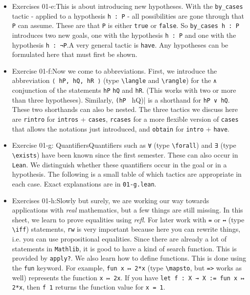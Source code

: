 \documentclass{memoir}
\begin{document}
\begin{itemize}
\begin{itemize}
\end{itemize}
\item Exercises 01-e:This is about introducing new hypotheses. With the \Verb|by_cases| tactic - applied to a hypothesis \Verb|h : P| - all possibilities are gone through that \Verb|P| can assume. These are that \Verb|P| is either \Verb|true| or \Verb|false|. So \Verb|by_cases h : P| introduces two new goals, one with the hypothesis \Verb|h : P| and one with the hypothesis \Verb|h : ¬P|.A very general tactic is \Verb|have|. Any hypotheses can be formulated here that must first be shown.\item Exercise 01-f:Now we come to abbreviations. First, we introduce the abbreviation \Verb|⟨ hP, hQ, hR ⟩| (type \Verb|\langle| and \Verb|\rangle|) for the \Verb|∧| conjunction of the statements \Verb|hP| \Verb|hQ| and \Verb|hR|. (This works with two or more than three hypotheses). Similarly, \Verb|(hP | hQ)| is a shorthand for \Verb|hP ∨ hQ|. These two shorthands can also be nested. The three tactics we discuss here are \Verb|rintro| for \Verb|intros| + \Verb|cases|, \Verb|rcases| for a more flexible version of \Verb|cases| that allows the notations just introduced, and \Verb|obtain| for \Verb|intro| + \Verb|have|.\item Exercise 01-g: QuantifiersQuantifiers such as \Verb|∀| (type \Verb|\forall|) and \Verb|∃| (type \Verb|\exists|) have been known since the first semester. These can also occur in \Verb|Lean|. We distinguish whether these quantifiers occur in the goal or in a hypothesis. The following is a small table of which tactics are appropriate in each case. Exact explanations are in \Verb|01-g.lean|.
\end{itemize}




\begin{itemize}
\item Exercises 01-h:Slowly but surely, we are working our way towards applications with \emph{real} mathematics, but a few things are still missing. In this sheet, we learn to prove equalities using \emph{refl}. For later work with \Verb|=| or \Verb|↔| (type \Verb|\iff|) statements, \Verb|rw| is very important because here you can rewrite things, i.e. you can use propositional equalities. Since there are already a lot of statements in \Verb|Mathlib|, it is good to have a kind of search function. This is provided by \Verb|apply?|. We also learn how to define functions. This is done using the \Verb|fun| keyword. For example, \Verb|fun x ↦ 2*x| (type \Verb|\mapsto|, but \Verb|=>| works as well) represents the function \Verb|x ↦ 2x|. If you have \Verb|let f : X → X := fun x ↦ 2*x|, then \Verb|f 1| returns the function value for \Verb|x = 1|.

\end{itemize}
\end{document}
